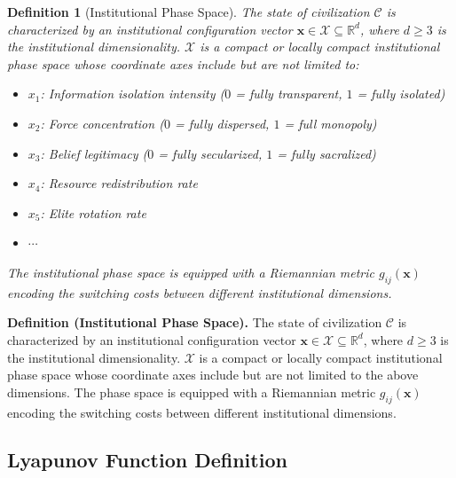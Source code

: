 \documentclass[12pt,a4paper]{article}
\newtheorem{definition}[theorem]{Definition}
\theoremstyle{definition}
\newcommand{\civ}{\mathcal{C}}
\newcommand{\R}{\mathbb{R}}
\newcommand{\calX}{\mathcal{X}}
\begin{document}
\begin{definition}[Institutional Phase Space]
\label{def:phase_space}
The state of civilization $\civ$ is characterized by an institutional configuration vector $\mathbf{x} \in \calX \subseteq \R^d$, where $d \geq 3$ is the institutional dimensionality. $\calX$ is a compact or locally compact institutional phase space whose coordinate axes include but are not limited to:
\begin{itemize}
    \item $x_1$: Information isolation intensity ($0$ = fully transparent, $1$ = fully isolated)
    \item $x_2$: Force concentration ($0$ = fully dispersed, $1$ = full monopoly)
    \item $x_3$: Belief legitimacy ($0$ = fully secularized, $1$ = fully sacralized)
    \item $x_4$: Resource redistribution rate
    \item $x_5$: Elite rotation rate
    \item $\cdots$
\end{itemize}
The institutional phase space is equipped with a Riemannian metric $g_{ij}(\mathbf{x})$ encoding the switching costs between different institutional dimensions.
\end{definition}

\noindent
\textbf{Definition (Institutional Phase Space).}
The state of civilization $\civ$ is characterized by an institutional configuration vector $\mathbf{x} \in \calX \subseteq \R^d$, where $d \geq 3$ is the institutional dimensionality. $\calX$ is a compact or locally compact institutional phase space whose coordinate axes include but are not limited to the above dimensions. The phase space is equipped with a Riemannian metric $g_{ij}(\mathbf{x})$ encoding the switching costs between different institutional dimensions.

\subsection{Lyapunov Function Definition}
\label{sec:lyap_def}
\end{document}
